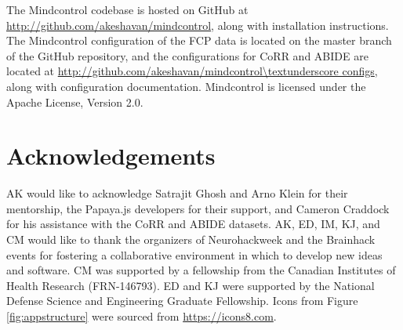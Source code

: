  The Mindcontrol codebase is hosted on GitHub at \url{http://github.com/akeshavan/mindcontrol}, along with installation instructions. The Mindcontrol configuration of the FCP data is located on the master branch of the GitHub repository, and the configurations for CoRR and ABIDE are located at \url{http://github.com/akeshavan/mindcontrol\textunderscore configs}, along with configuration documentation. Mindcontrol is licensed under the Apache License, Version 2.0.


\section{Acknowledgements}
AK would like to acknowledge Satrajit Ghosh and Arno Klein for their mentorship, the Papaya.js developers for their support, and Cameron Craddock for his assistance with the CoRR and ABIDE datasets. AK, ED, IM, KJ, and CM would like to thank the organizers of Neurohackweek and the Brainhack events for fostering a collaborative environment in which to develop new ideas and software. CM was supported by a fellowship from the Canadian Institutes of Health Research (FRN-146793).  ED and KJ were supported by the National Defense Science and Engineering Graduate Fellowship. Icons from Figure \ref{fig:appstructure} were sourced from \href{https://icons8.com}{https://icons8.com}.



{}


